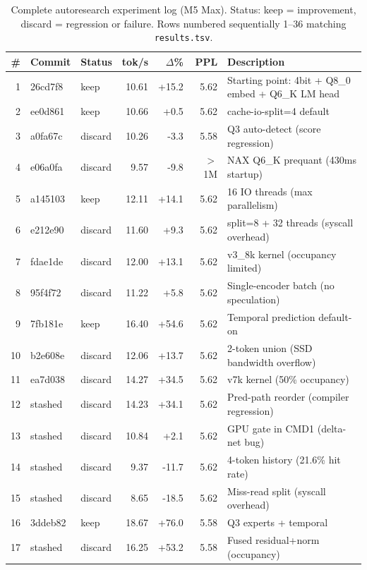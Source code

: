 \documentclass[11pt,twocolumn]{article}
\begin{document}
\begin{table}[h]
\centering
\caption{Complete autoresearch experiment log (M5 Max). Status: keep = improvement, discard = regression or failure. Rows numbered sequentially 1--36 matching \texttt{results.tsv}.}
\label{tab:experiments}
\footnotesize
\begin{tabular}{rllrrrp{6cm}}
\toprule
\textbf{\#} & \textbf{Commit} & \textbf{Status} & \textbf{tok/s} & \textbf{$\Delta$\%} & \textbf{PPL} & \textbf{Description} \\
\midrule
1 & 26cd7f8 & keep & 10.61 & +15.2 & 5.62 & Starting point: 4bit + Q8\_0 embed + Q6\_K LM head \\
2 & ee0d861 & keep & 10.66 & +0.5 & 5.62 & cache-io-split=4 default \\
3 & a0fa67c & discard & 10.26 & -3.3 & 5.58 & Q3 auto-detect (score regression) \\
4 & e06a0fa & discard & 9.57 & -9.8 & $>$1M & NAX Q6\_K prequant (430ms startup) \\
5 & a145103 & keep & 12.11 & +14.1 & 5.62 & 16 IO threads (max parallelism) \\
6 & e212e90 & discard & 11.60 & +9.3 & 5.62 & split=8 + 32 threads (syscall overhead) \\
7 & fdae1de & discard & 12.00 & +13.1 & 5.62 & v3\_8k kernel (occupancy limited) \\
8 & 95f4f72 & discard & 11.22 & +5.8 & 5.62 & Single-encoder batch (no speculation) \\
9 & 7fb181e & keep & 16.40 & +54.6 & 5.62 & Temporal prediction default-on \\
10 & b2e608e & discard & 12.06 & +13.7 & 5.62 & 2-token union (SSD bandwidth overflow) \\
11 & ea7d038 & discard & 14.27 & +34.5 & 5.62 & v7k kernel (50\% occupancy) \\
12 & stashed & discard & 14.23 & +34.1 & 5.62 & Pred-path reorder (compiler regression) \\
13 & stashed & discard & 10.84 & +2.1 & 5.62 & GPU gate in CMD1 (delta-net bug) \\
14 & stashed & discard & 9.37 & -11.7 & 5.62 & 4-token history (21.6\% hit rate) \\
15 & stashed & discard & 8.65 & -18.5 & 5.62 & Miss-read split (syscall overhead) \\
16 & 3ddeb82 & keep & 18.67 & +76.0 & 5.58 & Q3 experts + temporal \\
17 & stashed & discard & 16.25 & +53.2 & 5.58 & Fused residual+norm (occupancy) \\

\end{tabular}
\end{table}
\end{document}
